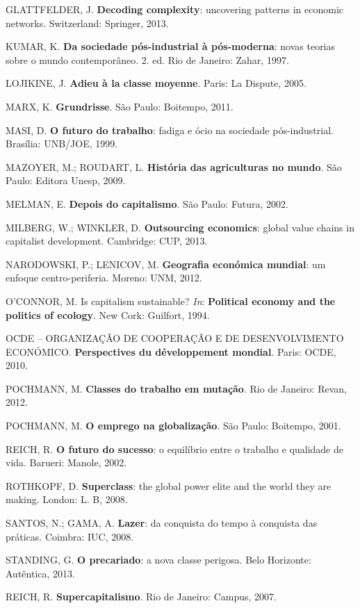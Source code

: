 GLATTFELDER, J. \textbf{Decoding complexity}: uncovering patterns in
economic networks. Switzerland: Springer, 2013.

KUMAR, K. \textbf{Da sociedade pós-industrial à pós-moderna}: novas
teorias sobre o mundo contemporâneo. 2. ed. Rio de Janeiro: Zahar, 1997.

LOJIKINE, J. \textbf{Adieu à la classe moyenne}. Paris: La Dispute,
2005.

MARX, K. \textbf{Grundrisse}. São Paulo: Boitempo, 2011.

MASI, D. \textbf{O futuro do trabalho}: fadiga e ócio na sociedade
pós-industrial. Brasília: UNB/JOE, 1999.

MAZOYER, M.; ROUDART, L. \textbf{História das agriculturas no mundo}.
São Paulo: Editora Unesp, 2009.

MELMAN, E. \textbf{Depois do capitalismo}. São Paulo: Futura, 2002.

MILBERG, W.; WINKLER, D. \textbf{Outsourcing economics}: global value
chains in capitalist development. Cambridge: CUP, 2013.

NARODOWSKI, P.; LENICOV, M. \textbf{Geografia económica mundial}: um
enfoque centro-periferia. Moreno: UNM, 2012.

O'CONNOR, M. Is capitalism sustainable? \emph{In}: \textbf{Political
economy and the politics of ecology}. New Cork: Guilfort, 1994.

OCDE -- ORGANIZAÇÃO DE COOPERAÇÃO E DE DESENVOLVIMENTO ECONÓMICO.
\textbf{Perspectives du développement mondial}. Paris: OCDE, 2010.

POCHMANN, M. \textbf{Classes do trabalho em mutação}. Rio de Janeiro:
Revan, 2012.

POCHMANN, M. \textbf{O emprego na globalização}. São Paulo: Boitempo,
2001.

REICH, R. \textbf{O futuro do sucesso}: o equilíbrio entre o trabalho e
qualidade de vida. Barueri: Manole, 2002.

ROTHKOPF, D. \textbf{Superclass}: the global power elite and the world
they are making. London: L. B, 2008.

SANTOS, N.; GAMA, A. \textbf{Lazer}: da conquista do tempo à conquista
das práticas. Coimbra: IUC, 2008.

STANDING, G. \textbf{O precariado}: a nova classe perigosa. Belo
Horizonte: Autêntica, 2013.

REICH, R. \textbf{Supercapitalismo}. Rio de Janeiro: Campus, 2007.
